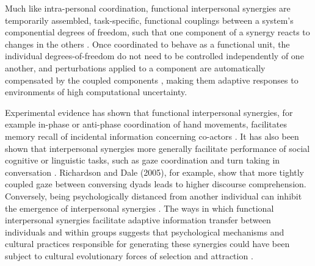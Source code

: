 \begin{CJK}{UTF8}{gbsn}
{Much like intra-personal coordination, functional interpersonal synergies are temporarily assembled, task-specific, functional couplings between a system's componential degrees of freedom, such that one component of a synergy reacts to changes in the others \citep{Kelso2009}.  Once coordinated to behave as a functional unit, the individual degrees-of-freedom do not need to be controlled independently of one another, and perturbations applied to a component are automatically compensated by the coupled components \citep{Kelso1984,Latash2002,Riley2011}, making them adaptive responses to environments of high computational uncertainty.

Experimental evidence has shown that functional interpersonal synergies, for example in-phase or anti-phase coordination of hand movements, facilitates memory recall of incidental information concerning co-actors \citep{Miles2010}. It has also been shown that interpersonal synergies more generally facilitate performance of social cognitive or linguistic tasks, such as gaze coordination and turn taking in conversation \citep{Richardson2005,Shockley2009}.  Richardson and Dale (2005), for example, show that more tightly coupled gaze between conversing dyads leads to higher discourse comprehension.  Conversely, being psychologically distanced from another individual can inhibit the emergence of interpersonal synergies \citep{Miles2010}.  The ways in which functional interpersonal synergies facilitate adaptive information transfer between individuals and within groups suggests that psychological mechanisms and cultural practices responsible for generating these synergies could have been subject to cultural evolutionary forces of selection and attraction \citep{Claidiere2014,Mesoudi2016a}.

}
\end{CJK}
